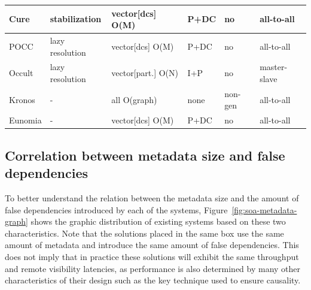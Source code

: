\begin{center}
\begin{table}
\begin{tabular}{ |m{5em}||m{5em}|m{5em}|m{5em}|m{4em}|m{5em}| }
        \hline
        Cure & stabilization & vector[dcs] O(M) & P+DC & no & all-to-all \\ 
        \hline
        POCC & lazy resolution & vector[dcs] O(M) & P+DC & no & all-to-all \\ 
        \hline
        Occult & lazy resolution & vector[part.] O(N) & I+P & no & master-slave \\ 
        \hline
        Kronos & - & all O(graph) & none & non-gen & all-to-all \\ 
        \hline
        Eunomia & - & vector[dcs] O(M) & P+DC & no & all-to-all \\ 
        \hline
    \end{tabular}
\end{table}
\end{center}

\subsection{Correlation between metadata size and false dependencies}

To better understand the relation between the metadata size and the amount of false dependencies introduced by each of the systems, Figure~\ref{fig:soa-metadata-graph} shows the graphic distribution of existing systems based on these two characteristics. 
Note that the solutions placed in the same box use the same amount of metadata 
and introduce the same amount of false dependencies. 
This does not imply that in practice these solutions will exhibit the same 
throughput and remote visibility latencies, 
as performance is also determined by many other characteristics of their design 
such as the key technique used to ensure causality.

